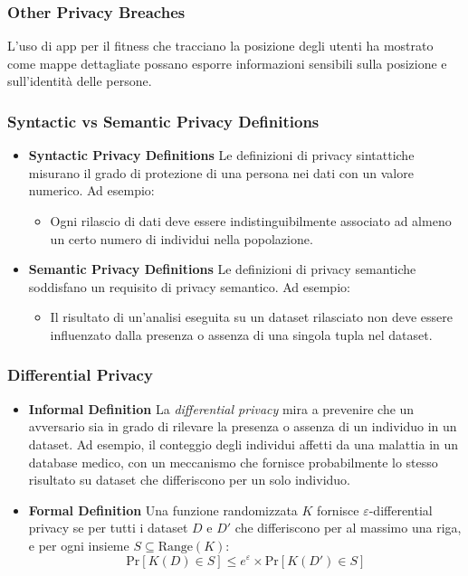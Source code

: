 \documentclass{report}
\begin{document}
\subsubsection{ Other Privacy Breaches}
L'uso di app per il fitness che tracciano la posizione degli utenti ha mostrato come mappe dettagliate possano esporre informazioni sensibili sulla posizione e sull'identità delle persone.

\subsubsection{ Syntactic vs Semantic Privacy Definitions}
\begin{itemize}
    \item \textbf{Syntactic Privacy Definitions}
    Le definizioni di privacy sintattiche misurano il grado di protezione di una persona nei dati con un valore numerico. Ad esempio:
    \begin{itemize}
        \item Ogni rilascio di dati deve essere indistinguibilmente associato ad almeno un certo numero di individui nella popolazione.
    \end{itemize}

    \item \textbf{Semantic Privacy Definitions}
    Le definizioni di privacy semantiche soddisfano un requisito di privacy semantico. Ad esempio:
    \begin{itemize}
        \item Il risultato di un'analisi eseguita su un dataset rilasciato non deve essere influenzato dalla presenza o assenza di una singola tupla nel dataset.
    \end{itemize}
\end{itemize}

\subsubsection{ Differential Privacy}
\begin{itemize}
    \item \textbf{Informal Definition}
    La \textit{differential privacy} mira a prevenire che un avversario sia in grado di rilevare la presenza o assenza di un individuo in un dataset. 
    Ad esempio, il conteggio degli individui affetti da una malattia in un database medico, con un meccanismo che fornisce probabilmente lo stesso risultato su dataset che differiscono per un solo individuo.
    \item \textbf{Formal Definition}
    Una funzione randomizzata $K$ fornisce $\varepsilon$-differential privacy se per tutti i dataset $D$ e $D'$ che differiscono per al massimo una riga, e per ogni insieme $S \subseteq \text{Range}(K)$:
    \[
    \text{Pr}[K(D) \in S] \leq e^{\varepsilon} \times \text{Pr}[K(D') \in S]
    \]
\end{itemize}
\end{document}

